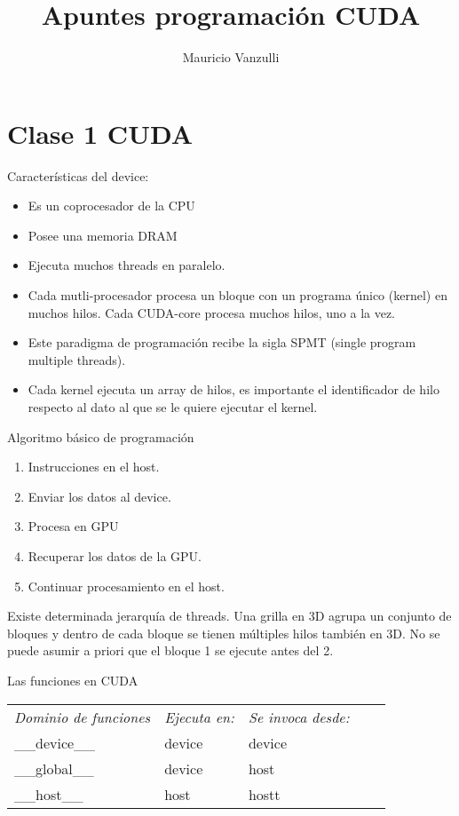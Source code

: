 \documentclass[]{scrartcl}
\title{Apuntes programación CUDA}
\author{Mauricio Vanzulli}
\begin{document}
\maketitle


\section{Clase 1 CUDA}

Características del device:

\begin{itemize}
	\item Es un coprocesador de la CPU
	\item Posee una memoria DRAM
	\item Ejecuta muchos threads en paralelo.
	\item Cada mutli-procesador procesa un bloque con un programa único (kernel) en muchos hilos. Cada CUDA-core procesa muchos hilos, uno a la vez.
	\item Este paradigma de programación recibe la sigla SPMT (single program multiple threads).
	\item Cada kernel ejecuta un array de hilos, es importante el identificador de hilo respecto al dato al que se le quiere ejecutar el kernel.
\end{itemize}

Algoritmo básico de programación
\begin{enumerate}
	\item Instrucciones en el host.
	\item Enviar los datos al device.
	\item Procesa en GPU
	\item Recuperar los datos de la GPU.
	\item Continuar procesamiento en el host.
\end{enumerate}

Existe determinada jerarquía de threads. Una grilla en 3D agrupa un conjunto de bloques y dentro de cada bloque se tienen múltiples hilos también en 3D. No se puede asumir a priori que el bloque 1 se ejecute antes del 2.

\pagebreak
Las funciones en CUDA 


\begin{table}[ht]
	\begin{tabular}{|l|l|l|ll}
		\cline{1-3}
		\textit{Dominio de funciones} & \textit{Ejecuta en:} & \textit{Se invoca desde:} & \textit{} &  \\ \cline{1-3}
		\_\_device\_\_   & device               & device                    &           &  \\ \cline{1-3}
		\_\_global\_\_   & device               & host                      &           &  \\ \cline{1-3}
		\_\_host\_\_     & host                 & hostt                     &           &  \\ \cline{1-3}
	\end{tabular}
\end{table}
\end{document}

